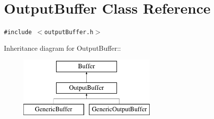 \hypertarget{classOutputBuffer}{
\section{OutputBuffer Class Reference}
\label{classOutputBuffer}
}
{\tt \#include $<$outputBuffer.h$>$}

Inheritance diagram for OutputBuffer::\begin{figure}[H]
\begin{center}
\leavevmode
\includegraphics[height=3cm]{classOutputBuffer}
\end{center}
\end{figure}
